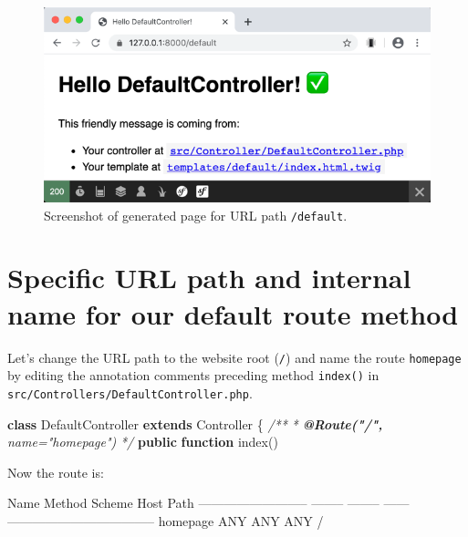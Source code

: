 \documentclass[a4paperpaper,openright]{book}
\newenvironment{Shaded}{}{}
\newcommand{\AnnotationTok}[1]{\textcolor[rgb]{0.38,0.63,0.69}{\textbf{\textit{#1}}}}
\newcommand{\CommentTok}[1]{\textcolor[rgb]{0.38,0.63,0.69}{\textit{#1}}}
\newcommand{\ExtensionTok}[1]{#1}
\newcommand{\KeywordTok}[1]{\textcolor[rgb]{0.00,0.44,0.13}{\textbf{#1}}}
\newcommand{\NormalTok}[1]{#1}
\newcommand{\OtherTok}[1]{\textcolor[rgb]{0.00,0.44,0.13}{#1}}
\begin{document}
\begin{figure}
\centering
\includegraphics{./tex2pdf.-65f13e14688ab55b/4e20ebf6b80bf441fbc12d17c09ac3680e146cf1.png}
\caption{Screenshot of generated page for URL path \texttt{/default}.
\label{generated_default_twig}}
\end{figure}

\hypertarget{specific-url-path-and-internal-name-for-our-default-route-method}{%
\section{Specific URL path and internal name for our default route
method}\label{specific-url-path-and-internal-name-for-our-default-route-method}}

Let's change the URL path to the website root (\texttt{/}) and name the
route \texttt{homepage} by editing the annotation comments preceding
method \texttt{index()} in
\texttt{src/Controllers/DefaultController.php}.

\begin{Shaded}
\begin{Highlighting}[]
    \KeywordTok{class}\NormalTok{ DefaultController }\KeywordTok{extends}\NormalTok{ Controller}
\NormalTok{    \{}
        \CommentTok{/**}
\CommentTok{         * }\AnnotationTok{@Route("/",}\CommentTok{ name="homepage")}
\CommentTok{         */}
        \KeywordTok{public} \KeywordTok{function}\NormalTok{ index}\OtherTok{()}
\end{Highlighting}
\end{Shaded}

Now the route is:

\begin{Shaded}
\begin{Highlighting}[]
  \ExtensionTok{Name}\NormalTok{                       Method   Scheme   Host   Path}
 \ExtensionTok{--------------------------}\NormalTok{ -------- -------- ------ -----------------------------------}
  \ExtensionTok{homepage}\NormalTok{                   ANY      ANY      ANY    /}
\end{Highlighting}
\end{Shaded}
\end{document}
